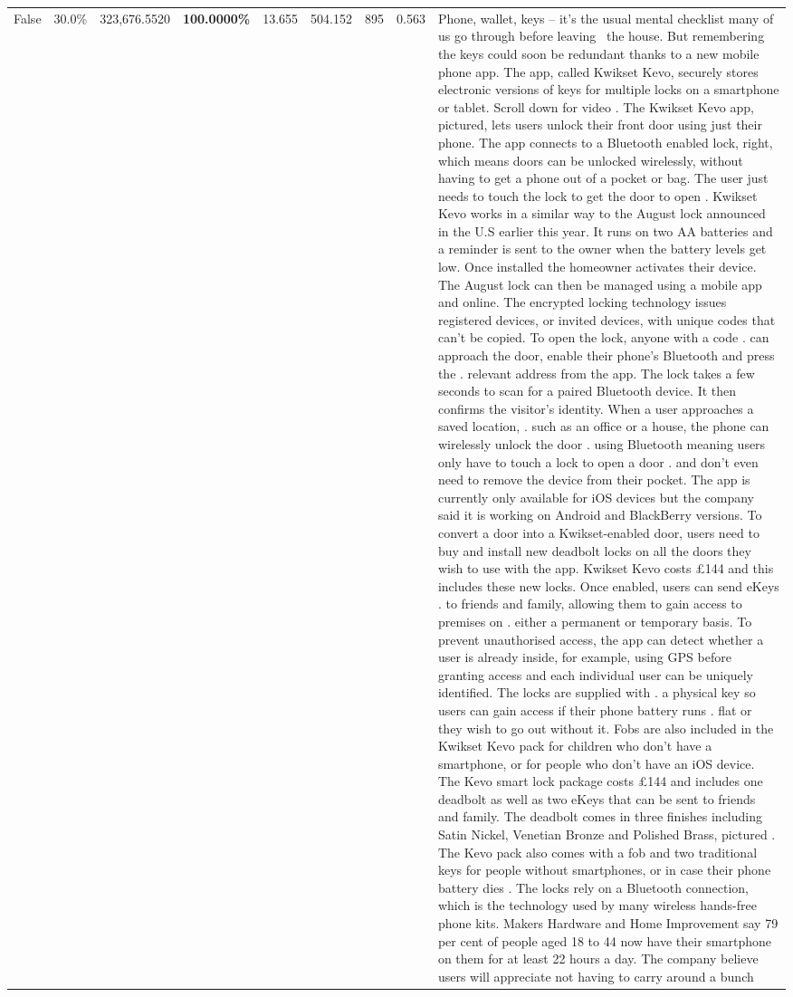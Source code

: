 \begin{table}[H]
\begin{tabular}{lllrlllll}
False & 30.0\% & 323,676.5520 & \bfseries \color{red} 100.0000\% & 13.655 & 504.152 & 895 & 0.563 & Phone, wallet, keys – it’s the usual mental checklist many of us go through before leaving  the house. But remembering the keys could soon be redundant thanks to a new mobile phone app. The app, called Kwikset Kevo, securely stores electronic versions of keys for multiple locks on a smartphone or tablet. Scroll down for video . The Kwikset Kevo app, pictured, lets users unlock their front door using just their phone. The app connects to a Bluetooth enabled lock, right, which means doors can be unlocked wirelessly, without having to get a phone out of a pocket or bag. The user just needs to touch the lock to get the door to open . Kwikset Kevo works in a similar way to the August lock announced in the U.S earlier this year. It runs on two AA batteries and a reminder is sent to the owner when the battery levels get low. Once installed the homeowner activates their device. The August lock can then be managed using a mobile app and online. The encrypted locking technology issues registered devices, or invited devices, with unique codes that can't be copied. To open the lock, anyone with a code . can approach the door, enable their phone's Bluetooth and press the . relevant address from the app. The lock takes a few seconds to scan for a paired Bluetooth device. It then confirms the visitor's identity. When a user approaches a saved location, . such as an office or a house, the phone can wirelessly unlock the door . using Bluetooth meaning users only have to touch a lock to open a door . and don't even need to remove the device from their pocket. The app is currently only available for iOS devices but the company said it is working on Android and BlackBerry versions. To convert a door into a Kwikset-enabled door, users need to buy and install new deadbolt locks on all the doors they wish to use with the app. Kwikset Kevo costs £144 and this includes these new locks. Once enabled, users can send eKeys . to friends and family, allowing them to gain access to premises on . either a permanent or temporary basis. To prevent unauthorised access, the app can detect whether a user is already inside, for example, using GPS before granting access and each individual user can be uniquely identified. The locks are supplied with . a physical key so users can gain access if their phone battery runs . flat or they wish to go out without it. Fobs are also included in the Kwikset Kevo pack for children who don't have a smartphone, or for people who don't have an iOS device. The Kevo smart lock package costs £144 and includes one deadbolt as well as two eKeys that can be sent to friends and family. The deadbolt comes in three finishes including Satin Nickel, Venetian Bronze and Polished Brass, pictured . The Kevo pack also comes with a fob and two traditional keys for people without smartphones, or in case their phone battery dies . The locks rely on a Bluetooth connection, which is the technology used by many wireless hands-free phone kits. Makers Hardware and Home Improvement say 79 per cent of people aged 18 to 44 now have their smartphone on them for at least 22 hours a day. The company believe users will appreciate not having to carry around a bunch 
\end{tabular}
\end{table}
